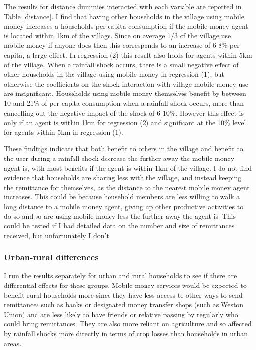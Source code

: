 The results for distance dummies interacted with each variable are reported in Table \ref{distance}. I find that having other households in the village using mobile money increases a households per capita consumption if the mobile money agent is located within 1km of the village. Since on average 1/3 of the village use mobile money if anyone does then this corresponds to an increase of 6-8\% per capita, a large effect. In regression (2) this result also holds for agents within 5km of the village. When a rainfall shock occurs, there is a small negative effect of other households in the village using mobile money in regression (1), but otherwise the coefficients on the shock interaction with village mobile money use are insignificant. Households using mobile money themselves benefit by between 10 and 21\% of per capita consumption when a rainfall shock occurs, more than cancelling out the negative impact of the shock of 6-10\%. However this effect is only if an agent is within 1km for regression (2) and significant at the 10\% level for agents within 5km in regression (1). 

These findings indicate that both benefit to others in the village and benefit to the user during a rainfall shock decrease the further away the mobile money agent is, with most benefits if the agent is within 1km of the village. I do not find evidence that households are sharing less with the village, and instead keeping the remittance for themselves, as the distance to the nearest mobile money agent increases. This could be because household members are less willing to walk a long distance to a mobile money agent, giving up other productive activities to do so and so are using mobile money less the further away the agent is. This could be tested if I had detailed data on the number and size of remittances received, but unfortunately I don't.   



\subsubsection{Urban-rural differences}
I run the results separately for urban and rural households to see if there are differential effects for these groups. Mobile money services would be expected to benefit rural households more since they have less access to other ways to send remittances such as banks or designated money transfer shops (such as Weston Union) and are less likely to have friends or relative passing by regularly who could bring remittances. They are also more reliant on agriculture and so affected by rainfall shocks more directly in terms of crop losses than households in urban areas. 

